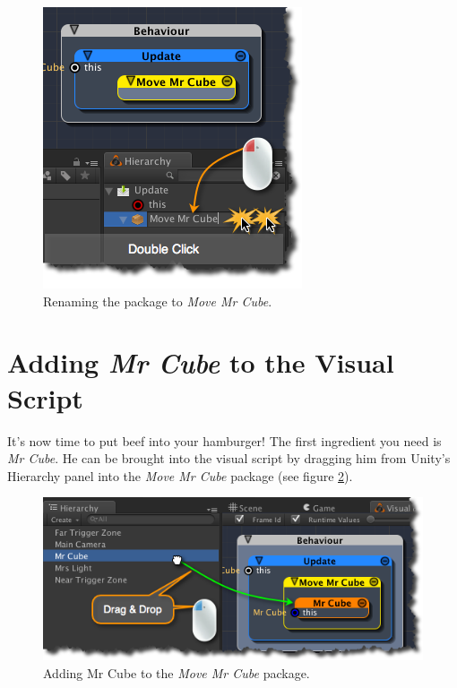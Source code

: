 \begin{figure}[htbp]
\centering
\includegraphics[keepaspectratio,width=\textwidth,height=0.75\textheight]{renaming-move-mr-cube-package.png}
\caption{Renaming the package to \emph{Move Mr Cube}.}
\label{renaming-move-mr-cube-package.png}
\end{figure}

\section{Adding \emph{Mr Cube} to the Visual Script}
\label{addingmrcubetothevisualscript}

It's now time to put beef into your hamburger! The first ingredient you need is \emph{Mr Cube}. He can be brought into the visual script by dragging him from Unity's Hierarchy panel into the \emph{Move Mr Cube} package (see figure \ref{drag-and-drop-mr-cube.png}).

\begin{figure}[htbp]
\centering
\includegraphics[keepaspectratio,width=\textwidth,height=0.75\textheight]{drag-and-drop-mr-cube.png}
\caption{Adding Mr Cube to the \emph{Move Mr Cube} package.}
\label{drag-and-drop-mr-cube.png}
\end{figure}

